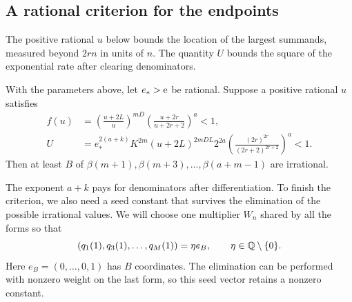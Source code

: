 \subsection{A rational criterion for the endpoints}

The positive rational $u$ below bounds the location of the largest
summands, measured beyond $2rn$ in units of $n$. The quantity $U$
bounds the square of the exponential rate after clearing
denominators.

\begin{proposition}\label{prop:criterion}
With the parameters above, let $e_*>\mathrm e$ be rational. Suppose
a positive rational $u$ satisfies
\begin{align}
 f(u)&=\left(\frac{u+2L}{u}\right)^{mD}
       \left(\frac{u+2r}{u+2r+2}\right)^a<1,\label{eq:f}\\
 U&=e_*^{2(a+k)}K^{2m}(u+2L)^{2mDL}2^{2a}
       \left(\frac{(2r)^{2r}}{(2r+2)^{2r+2}}\right)^a<1.
 \label{eq:U}
\end{align}
Then at least $B$ of
$\beta(m+1),\beta(m+3),\ldots,\beta(a+m-1)$ are irrational.
\end{proposition}

The exponent $a+k$ pays for denominators after differentiation.
To finish the criterion, we also need a seed constant that survives
the elimination of the possible irrational values. We will choose
one multiplier $W_n$ shared by all the forms so that
\begin{equation}\label{eq:seed-target}
 (q_1(1),q_3(1),\ldots,q_M(1))=\eta e_B,
 \qquad \eta\in\mathbb Q\setminus\{0\}.
\end{equation}
Here $e_B=(0,\ldots,0,1)$ has $B$ coordinates.
The elimination can be performed with nonzero weight on the last
form, so this seed vector retains a nonzero constant.
